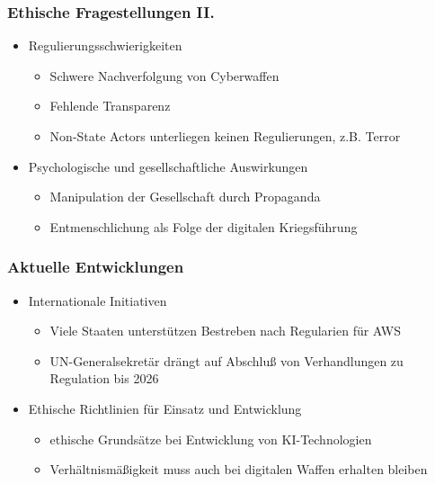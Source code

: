 \documentclass[12pt]{beamer}
\begin{document}
\begin{frame}
    \frametitle{Ethische Fragestellungen II.}
    \begin{itemize}
        \item Regulierungsschwierigkeiten
        \begin{itemize}
            \item Schwere Nachverfolgung von Cyberwaffen
            \item Fehlende Transparenz \cite{dipert}
            \item Non-State Actors unterliegen keinen Regulierungen, z.B. Terror
        \end{itemize}
        \item Psychologische und gesellschaftliche Auswirkungen
        \begin{itemize}
            \item Manipulation der Gesellschaft durch Propaganda
            \item Entmenschlichung als Folge der digitalen Kriegsführung \cite{vaticannews}
        \end{itemize}  
    \end{itemize}
\end{frame}

\begin{frame}
    \frametitle{Aktuelle Entwicklungen}
    \begin{itemize}
        \item Internationale Initiativen
        \begin{itemize}
            \item Viele Staaten unterstützen Bestreben nach Regularien für AWS \cite{amnesty}
            \item UN-Generalsekretär drängt auf Abschluß von Verhandlungen zu Regulation bis 2026 \cite{amnesty}
        \end{itemize}
        \item Ethische Richtlinien für Einsatz und Entwicklung
        \begin{itemize}
            \item ethische Grundsätze bei Entwicklung von KI-Technologien \cite{vaticannews}
            \item Verhältnismäßigkeit muss auch bei digitalen Waffen erhalten bleiben \cite{dipert}
        \end{itemize}
    \end{itemize}    
     
\end{frame}

 
\begin{frame}[allowframebreaks]
    \printbibliography
\end{frame}
\end{document}
